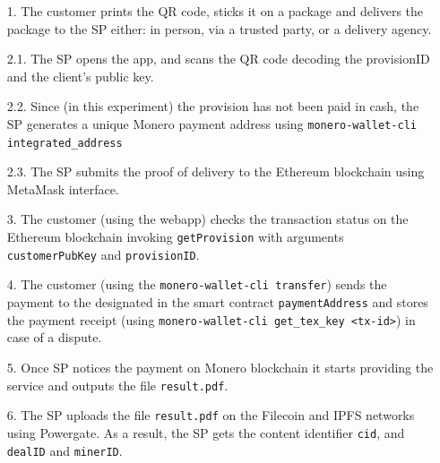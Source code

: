 \documentclass[pdftex,twocolumn,epjc3]{svjour3}
\begin{document}
{\begin{enumerate}
  \item[1.] The customer prints the QR code, sticks it on a package and delivers the package to the SP either: in person, via a trusted party, or a delivery agency.

  \item[2.1.] The SP opens the app, and scans the QR code decoding the provisionID and the client's public key.

  \item[2.2.] Since (in this experiment) the provision has not been paid in cash, the SP generates a unique Monero payment address using \texttt{monero-wallet-cli integrated\_address} 
  \item[2.3.] The SP submits the proof of delivery to the Ethereum blockchain using MetaMask interface. 

  \item[3.] The customer (using the webapp) checks the transaction status on the Ethereum blockchain invoking \texttt{getProvision} with arguments \texttt{customerPubKey} and \texttt{provisionID}.

  \item[4.] The customer (using the \texttt{monero-wallet-cli transfer}) sends the payment to the designated in the smart contract \texttt{paymentAddress} and stores the payment receipt (using \texttt{monero-wallet-cli get\_tex\_key <tx-id>}) in case of a dispute.

  \item[5.] Once SP notices the payment on Monero blockchain it starts providing the service and outputs the file \texttt{result.pdf}.

  \item[6.] The SP uploads the file \texttt{result.pdf} on the Filecoin and IPFS networks using Powergate. As a result, the SP gets the content identifier \texttt{cid}, and \texttt{dealID} and \texttt{minerID}.


\end{enumerate}}
\end{document}
